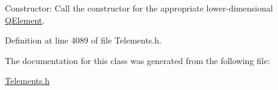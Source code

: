 Constructor\+: Call the constructor for the appropriate lower-\/dimensional \hyperlink{classoomph_1_1QElement}{Q\+Element}. 



Definition at line 4089 of file Telements.\+h.



The documentation for this class was generated from the following file\+:\begin{DoxyCompactItemize}
\item 
\hyperlink{Telements_8h}{Telements.\+h}\end{DoxyCompactItemize}
